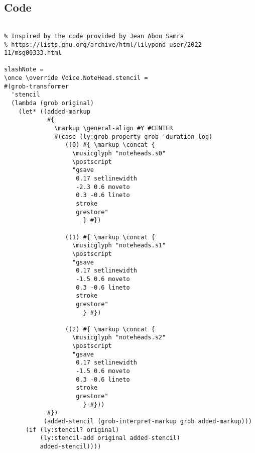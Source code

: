 \documentclass[11pt, oneside]{book}   	%
\begin{document}
\subsection{Code}
\begin{verbatim}

% Inspired by the code provided by Jean Abou Samra
% https://lists.gnu.org/archive/html/lilypond-user/2022-11/msg00333.html

slashNote =
\once \override Voice.NoteHead.stencil =
#(grob-transformer
  'stencil
  (lambda (grob original)
    (let* ((added-markup
            #{
              \markup \general-align #Y #CENTER
              #(case (ly:grob-property grob 'duration-log)
                 ((0) #{ \markup \concat {
                   \musicglyph "noteheads.s0"
                   \postscript
                   "gsave 
                    0.17 setlinewidth 
                    -2.3 0.6 moveto 
                    0.3 -0.6 lineto
                    stroke 
                    grestore"
                      } #})

                 ((1) #{ \markup \concat {
                   \musicglyph "noteheads.s1"
                   \postscript
                   "gsave 
                    0.17 setlinewidth 
                    -1.5 0.6 moveto 
                    0.3 -0.6 lineto
                    stroke 
                    grestore"
                      } #})

                 ((2) #{ \markup \concat {
                   \musicglyph "noteheads.s2"
                   \postscript
                   "gsave 
                    0.17 setlinewidth 
                    -1.5 0.6 moveto 
                    0.3 -0.6 lineto
                    stroke 
                    grestore"
                      } #}))
            #})
           (added-stencil (grob-interpret-markup grob added-markup)))
      (if (ly:stencil? original)
          (ly:stencil-add original added-stencil)
          added-stencil))))




\end{verbatim}
\end{document}
